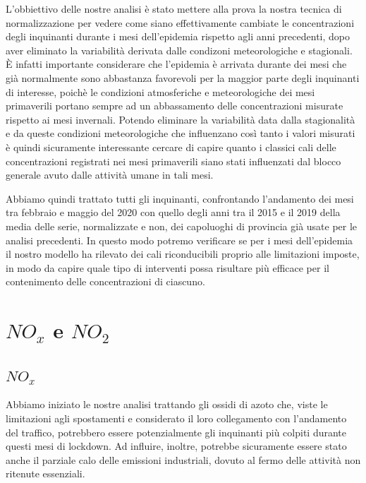 \documentclass[a4paper,12pt]{report}
\begin{document}
L'obbiettivo delle nostre analisi è stato mettere alla prova la nostra tecnica di normalizzazione per vedere come siano effettivamente cambiate le concentrazioni degli inquinanti durante i mesi dell'epidemia rispetto agli anni precedenti, dopo aver eliminato la variabilità derivata dalle condizoni meteorologiche e stagionali. È infatti importante considerare che l'epidemia è arrivata durante dei mesi che già normalmente sono abbastanza favorevoli per la maggior parte degli inquinanti di interesse, poichè le condizioni atmosferiche e meteorologiche dei mesi primaverili portano sempre ad un abbassamento delle concentrazioni misurate rispetto ai mesi invernali.
Potendo eliminare la variabilità data dalla stagionalità e da queste condizioni meteorologiche che influenzano così tanto i valori misurati è quindi sicuramente interessante cercare di capire quanto i classici cali delle concentrazioni registrati nei mesi primaverili siano stati influenzati dal blocco generale avuto dalle attività umane in tali mesi.

Abbiamo quindi trattato tutti gli inquinanti, confrontando l'andamento dei mesi tra febbraio e maggio del 2020 con quello degli anni tra il 2015 e il 2019 della media delle serie, normalizzate e non, dei capoluoghi di provincia già usate per le analisi precedenti. In questo modo potremo verificare se per i mesi dell'epidemia il nostro modello ha rilevato dei cali riconducibili proprio alle limitazioni imposte, in modo da capire quale tipo di interventi possa risultare più efficace
 per il contenimento delle concentrazioni di ciascuno.

\section{$NO_x$ e $NO_2$}
\subsection{$NO_x$}
Abbiamo iniziato le nostre analisi trattando gli ossidi di azoto che, viste le limitazioni agli spostamenti e considerato il loro collegamento con l'andamento del traffico, potrebbero essere potenzialmente gli inquinanti più colpiti durante questi mesi di lockdown. Ad influire, inoltre, potrebbe sicuramente essere stato anche il parziale calo delle emissioni industriali, dovuto al fermo delle attività non ritenute essenziali.
\end{document}
